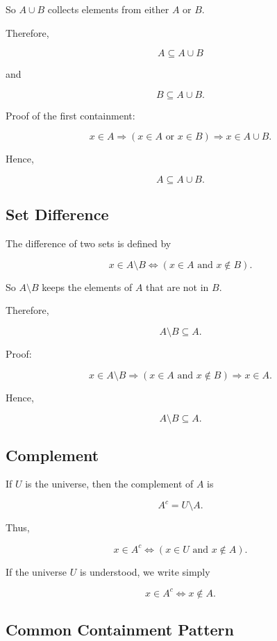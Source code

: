 \documentclass{article}
\begin{document}
	So \(A \cup B\) collects elements from either \(A\) or \(B\).
	
	Therefore,
	
	\[
	A \subseteq A \cup B
	\]
	
	and
	
	\[
	B \subseteq A \cup B.
	\]
	
	Proof of the first containment:
	
	\[
	x \in A
	\Rightarrow
	(x \in A \text{ or } x \in B)
	\Rightarrow
	x \in A \cup B.
	\]
	
	Hence,
	
	\[
	A \subseteq A \cup B.
	\]
	
	\subsection{Set Difference}
	
	The difference of two sets is defined by
	
	\[
	x \in A \setminus B
	\iff
	(x \in A \text{ and } x \notin B).
	\]
	
	So \(A \setminus B\) keeps the elements of \(A\) that are not in \(B\).
	
	Therefore,
	
	\[
	A \setminus B \subseteq A.
	\]
	
	Proof:
	
	\[
	x \in A \setminus B
	\Rightarrow
	(x \in A \text{ and } x \notin B)
	\Rightarrow
	x \in A.
	\]
	
	Hence,
	
	\[
	A \setminus B \subseteq A.
	\]
	
	\subsection{Complement}
	
	If \(U\) is the universe, then the complement of \(A\) is
	
	\[
	A^{c} = U \setminus A.
	\]
	
	Thus,
	
	\[
	x \in A^{c}
	\iff
	(x \in U \text{ and } x \notin A).
	\]
	
	If the universe \(U\) is understood, we write simply
	
	\[
	x \in A^{c}
	\iff
	x \notin A.
	\]
	
	\subsection{Common Containment Pattern}
	
\end{document}
